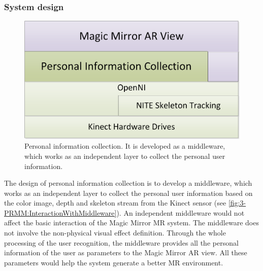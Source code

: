 \subsubsection{System design}
\begin{figure}
	\centering
	\includegraphics[width=0.7\linewidth]{figures/3-PRMM/middlewareFramework.png}
	\caption{Personal information collection. It is developed as a middleware, which works as an independent layer to collect the personal user information.}
	\label{fig:3-PRMM:middlewareFramework}
\end{figure}
The design of personal information collection is to develop a middleware, which works as an independent layer to collect the personal user information based on the color image, depth and skeleton stream from the Kinect sensor (see \figurename{\ref{fig:3-PRMM:InteractionWithMiddleware}}). An independent middleware would not affect the basic interaction of the Magic Mirror MR system. The middleware does not involve the non-physical visual effect definition. Through the whole processing of the user recognition, the middleware provides all the personal information of the user as parameters to the Magic Mirror AR view. All these parameters would help the system generate a better MR environment. 

